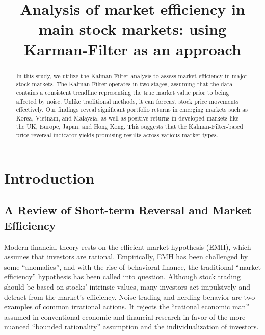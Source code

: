 
\title{Analysis of market efficiency in main stock markets: using Karman-Filter as an approach
}
\maketitle


\begin{abstract}
In this study, we utilize the Kalman-Filter analysis to assess market efficiency in major stock markets. The Kalman-Filter operates in two stages, assuming that the data contains a consistent trendline representing the true market value prior to being affected by noise. Unlike traditional methods, it can forecast stock price movements effectively. Our findings reveal significant portfolio returns in emerging markets such as Korea, Vietnam, and Malaysia, as well as positive returns in developed markets like the UK, Europe, Japan, and Hong Kong. This suggests that the Kalman-Filter-based price reversal indicator yields promising results across various market types.
\end{abstract}




\section{Introduction}
\subsection{A Review of Short-term Reversal and Market Efficiency}
Modern financial theory rests on the efficient market hypothesis (EMH), which assumes that investors are rational. Empirically, EMH has been challenged by some ``anomalies'', and with the rise of behavioral finance, the traditional ``market efficiency'' hypothesis has been called into question. Although stock trading should be based on stocks' intrinsic values, many investors act impulsively and detract from the market's efficiency. Noise trading and herding behavior are two examples of common irrational actions. It rejects the ``rational economic man'' assumed in conventional economic and financial research in favor of the more nuanced ``bounded rationality'' assumption and the individualization of investors.

